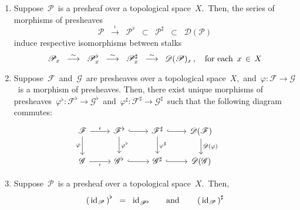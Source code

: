 \vskip 0.5cm
\begin{theorem}\label{PropertiesSheafification}
\mbox{}\vskip 0.1cm
\begin{enumerate}
\item
	Suppose \,$\mathscr{P}$\, is a presheaf over a topological space \,$X$.\,
	Then, the series of morphisms of presheaves
	\begin{equation*}
	\mathscr{P}
	\;\;\overset{\iota}{\longrightarrow}\;\;
		\mathscr{P}^{\flat}
	\;\;\subset\;\;
		\mathscr{P}^{\sharp}
	\;\;\subset\;\;
		\mathscr{D}(\mathscr{P})
	\end{equation*}
	induce respective isomorphisms between stalks
	\begin{equation*}
	\mathscr{P}_{x}
	\;\;\overset{\sim}{\longrightarrow}\;\;
		\mathscr{P}^{\flat}_{x}
	\;\;\overset{\sim}{\longrightarrow}\;\;
		\mathscr{P}^{\sharp}_{x}
	\;\;\overset{\sim}{\longrightarrow}\;\;
		\mathscr{D}(\mathscr{P})_{x}\,,
	\quad
	\textnormal{for each \,$x \,\in\, X$}
	\end{equation*}
\item
	Suppose \,$\mathscr{F}$\, and \,$\mathscr{G}$\, are presheaves over a topological space \,$X$,\,
	and \,$\varphi : \mathscr{F} \longrightarrow \mathscr{G}$\, is a morphism of presheaves.
	Then, there exist unique morphisms of presheaves
	\,$\varphi^{\flat} : \mathscr{F}^{\flat} \longrightarrow \mathscr{G}^{\flat}$\,
	and
	\,$\varphi^{\sharp} : \mathscr{F}^{\sharp} \longrightarrow \mathscr{G}^{\sharp}$\,
	such that the following diagram commutes:
	\begin{equation*}
	\begin{tikzcd}
	\mathscr{F} \arrow[r, "\iota"] \arrow[d, "\varphi"'] &
	\mathscr{F}^{\flat} \arrow[r, hook] \arrow[d, "\varphi^{\flat}"] &
	\mathscr{F}^{\sharp} \arrow[r, hook] \arrow[d, "\varphi^{\sharp}"] &
	\mathscr{D}(\mathscr{F}) \arrow[d, "\mathscr{D}(\varphi)"]
	\\
	\mathscr{G} \arrow[r, "\iota"'] &
	\mathscr{G}^{\flat} \arrow[r, hook] &
	\mathscr{G}^{\sharp} \arrow[r, hook] &
	\mathscr{D}(\mathscr{G}) &
	\end{tikzcd}
	\end{equation*}
\item
	Suppose \,$\mathscr{P}$\, is a presheaf over a topological space \,$X$.\,
	Then,
	\begin{equation*}
	\left(\,\id_{\mathscr{P}}\,\right)^{\flat}
	\;\; = \;\;
		\id_{\mathscr{P}^{\flat}}
	\quad\quad\textnormal{and}\quad\quad
	\left(\,\id_{\mathscr{P}}\,\right)^{\sharp}

\end{equation*}
\end{enumerate}
\end{theorem}
